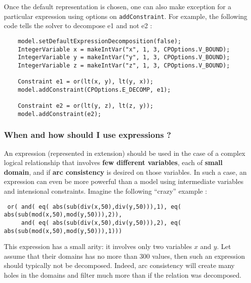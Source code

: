 Once the default representation is chosen, one can also make exception for a particular expression using options on \texttt{addConstraint}. 
For example, the following code tells the solver to decompose e1 and not e2 :
\begin{lstlisting}
	model.setDefaultExpressionDecomposition(false);
	IntegerVariable x = makeIntVar("x", 1, 3, CPOptions.V_BOUND);
	IntegerVariable y = makeIntVar("y", 1, 3, CPOptions.V_BOUND);
	IntegerVariable z = makeIntVar("z", 1, 3, CPOptions.V_BOUND);

	Constraint e1 = or(lt(x, y), lt(y, x));
	model.addConstraint(CPOptions.E_DECOMP, e1);
	
	Constraint e2 = or(lt(y, z), lt(z, y));
	model.addConstraint(e2);
\end{lstlisting}

\subsubsection{When and how should I use expressions ?}\label{model:whenshouldiuseexpressions}\hypertarget{model:whenshouldiuseexpressions}{}
An expression (represented in extension) should be used in the case of a complex logical relationship that involves \textbf{few different variables}, each of \textbf{small domain}, and if \textbf{arc consistency} is desired on those variables.
In such a case, an expression can even be more powerful than a model using intermediate variables and intensional constraints.
Imagine the following ``crazy'' example :
\begin{lstlisting}
 or( and( eq( abs(sub(div(x,50),div(y,50))),1), eq( abs(sub(mod(x,50),mod(y,50))),2)),
     and( eq( abs(sub(div(x,50),div(y,50))),2), eq( abs(sub(mod(x,50),mod(y,50))),1)))
\end{lstlisting}
This expression has a small arity: it involves only two variables $x$ and $y$.
Let assume that their domains has no more than 300 values, then such an expression should typically not be decomposed. Indeed, arc consistency will create many holes in the domains and filter much more than if the relation was decomposed.

